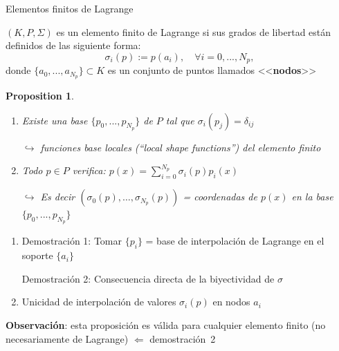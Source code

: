 \documentclass[10pt,leqno]{beamer}
\newcommand{\Np}{{N_p}}
\newtheorem{proposition}{Proposition}
\begin{document}
\begin{frame}{Elementos finitos de Lagrange}

  \begin{definition} $(K,P,\Sigma)$ es un \alert{elemento finito de
      Lagrange} si sus grados de libertad están definidos de las siguiente
    forma:
    $$
    \sigma_i(p) := p(a_i), \quad \forall i=0,...,\Np,
    $$
    donde $\{a_0,...,a_\Np\} \subset K$ es un conjunto de puntos
    llamados <<\textbf{nodos}>>
  \end{definition}
\pause
\begin{proposition}
  \begin{enumerate}
  \item Existe una base $\{p_0,...,p_\Np\}$ de $P$ tal que
    $\sigma_i(p_j)=\delta_{ij}$
    \begin{flushright} \scriptsize $\hookrightarrow$  \alert{funciones base} locales
      (``\textit{local shape functions}'') del elemento finito
    \end{flushright}
  \item Todo $p\in P$ verifica: $p(x)=\sum_{i=0}^\Np \sigma_i(p) p_i(x)$
    \begin{flushright} \scriptsize $\hookrightarrow$ Es decir
      \alert{$(\sigma_0(p),\dots,\sigma_\Np(p))$ = coordenadas de
        $p(x)$ }en la base $\{p_0,...,p_\Np\}$
    \end{flushright}
  \end{enumerate}
\end{proposition}

\begin{footnotesize}
  \begin{enumerate}
  \item Demostración 1: Tomar $\{p_i\}$ = base de interpolación de
    Lagrange en el soporte $\{a_i\}$ %
    \par
    Demostración 2: Consecuencia directa de la biyectividad de $\sigma$
    \item
    Unicidad de interpolación de valores $\sigma_i(p)$ en nodos $a_i$
  \end{enumerate}
\end{footnotesize}

\textbf{Observación}: \alert{esta proposición es válida para
  cualquier elemento finito} (no necesariamente de Lagrange)
\small
$\Leftarrow$ demostración~2
\end{frame}
\end{document}
